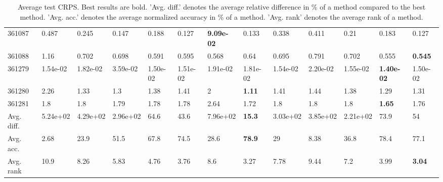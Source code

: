 \begin{table}[ht!]
\begin{tabular}{lllllllllllll}
  361087 & 0.487 & 0.245 & 0.147 & 0.188 & 0.127 & \textbf{9.09e-02} & 0.133 & 0.338 & 0.411 & 0.21 & 0.183 & 0.127 \\ 
  361088 & 1.16 & 0.702 & 0.698 & 0.591 & 0.595 & 0.568 & 0.64 & 0.695 & 0.791 & 0.702 & 0.555 & \textbf{0.545} \\ 
  361279 & 1.54e-02 & 1.82e-02 & 3.59e-02 & 1.50e-02 & 1.51e-02 & 1.91e-02 & 1.81e-02 & 1.54e-02 & 2.20e-02 & 1.55e-02 & \textbf{1.40e-02} & 1.50e-02 \\ 
  361280 & 2.26 & 1.33 & 1.3 & 1.38 & 1.41 & 2 & \textbf{1.11} & 1.41 & 1.44 & 1.38 & 1.29 & 1.31 \\ 
  361281 & 1.8 & 1.8 & 1.79 & 1.78 & 1.78 & 2.64 & 1.72 & 1.8 & 1.8 & 1.8 & \textbf{1.65} & 1.76 \\ 
   \hline
Avg. diff. & 5.24e+02 & 4.29e+02 & 2.96e+02 & 64.6 & 43.6 & 7.96e+02 & \textbf{15.3} & 3.03e+02 & 3.85e+02 & 2.21e+02 & 73.9 & 54 \\ 
  Avg. acc. & 2.68 & 23.9 & 51.5 & 67.8 & 74.5 & 28.6 & \textbf{78.9} & 29 & 8.38 & 36.8 & 78.4 & 77.1 \\ 
  Avg. rank & 10.9 & 8.26 & 5.83 & 4.76 & 3.76 & 8.6 & 3.27 & 7.78 & 9.44 & 7.2 & 3.99 & \textbf{3.04} \\ 
   \hline
\hline
\end{tabular}
\endgroup
\caption{Average test CRPS. 
                  Best results are bold. 
                  'Avg. diff.' denotes the average relative difference in \% of a method compared to the best method.
                  'Avg. acc.' denotes the average normalized accuracy in \% of a method.
                  'Avg. rank' denotes the average rank of a method.} 
\label{TABLES/table_results_CRPS}
\end{table}
